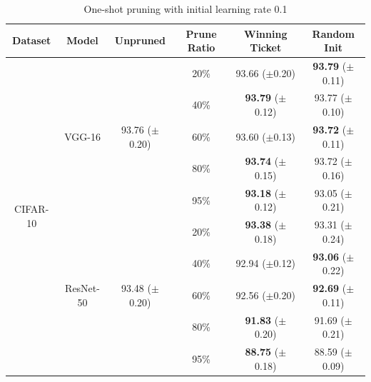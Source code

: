 \setlength{\tabcolsep}{4pt}
\renewcommand{\arraystretch}{1.15}
\begin{table}[!htbp]
\begin{subtable}[b]{\textwidth}
\centering
\small
\begin{tabular}{c|c|cccc}
\hline
Dataset                    & Model                   & Unpruned          & Prune Ratio & Winning Ticket       & Random Init          \\ \hline
\multirow{10}{*}{CIFAR-10} & \multirow{5}{*}{VGG-16} & \multirow{5}{*}{93.76 ($\pm$0.20)}  & 20\%        & 93.66 ($\pm$0.20)          &   \textbf{93.79} ($\pm$0.11)         \\
                           &                         &               & 40\%        &    \textbf{93.79}  ($\pm$0.12)        &  93.77  ($\pm$0.10)      \\
                           &                         &                & 60\%       &    93.60  ($\pm$0.13)        &   \textbf{93.72} ($\pm$0.11)         \\
                           &                         &               & 80\%       &     \textbf{93.74}  ($\pm$0.15)       & 93.72 ($\pm$0.16)           \\
              &                         &               & 95\%       &     \textbf{93.18}  ($\pm$0.12)       & 93.05 ($\pm$0.21)           \\
                  \cline{2-6} 
                           & \multirow{5}{*}{ResNet-50} & \multirow{5}{*}{93.48 ($\pm$0.20)}    & 20\%        &  \textbf{93.38} ($\pm$0.18)          &      93.31  ($\pm$0.24)             \\
                           &                         &                & 40\%        &     92.94  ($\pm$0.12)                 &  \textbf{93.06} ($\pm$0.22)       \\
                           &                         &                & 60\%        & 92.56 ($\pm$0.20)  & \textbf{92.69}  ($\pm$0.11) \\
                     &                         &               & 80\%        & \textbf{91.83} ($\pm$0.20)  & 91.69 ($\pm$0.21) \\
        &                         &               & 95\%        & \textbf{88.75} ($\pm$0.18)  & 88.59 ($\pm$0.09) \\
                    \hline
\end{tabular}
\vspace{1ex}
\caption{One-shot pruning with initial learning rate 0.1}

\end{subtable}
\end{table}
